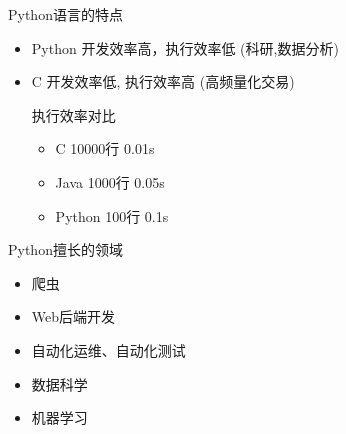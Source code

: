 
\begin{frame}{Python语言的特点}
    \begin{itemize}
        \item Python 开发效率高，执行效率低 (科研,数据分析)
        \item C 开发效率低, 执行效率高 (高频量化交易)
        \begin{alertblock}{\small{执行效率对比}}
            \begin{itemize}
                \item  C \qquad \quad 10000行 \quad 0.01s
                \item  Java \quad \quad 1000行 \quad 0.05s
                \item  Python \quad 100行 \quad 0.1s
            \end{itemize}
        \end{alertblock}

    \end{itemize}
\end{frame}

\begin{frame}{Python擅长的领域}
    \begin{itemize}
        \item 爬虫
        \item Web后端开发
        \item 自动化运维、自动化测试
        \item 数据科学
        \item 机器学习
    \end{itemize}
\end{frame}


